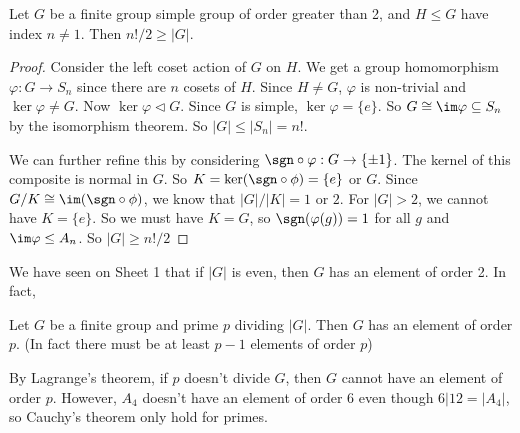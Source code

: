 \documentclass[a4paper]{article}
\begin{document}
  \begin{eg}
    Let $G$ be a finite group simple group of order greater than 2, and $H\leq G$ have index $n\not= 1$. Then $n!/2 \geq |G|$.
  \end{eg}

  \begin{proof}
    Consider the left coset action of $G$ on $H$. We get a group homomorphism $\varphi: G\to S_n$ since there are $n$ cosets of $H$. Since $H\not= G$, $\varphi$ is non-trivial and $\ker \varphi \not=G$. Now $\ker \varphi \lhd G$. Since $G$ is simple, $\ker\varphi = \{e\}$. So $G\cong \im \varphi \subseteq S_n$ by the isomorphism theorem. So $|G| \leq |S_n| = n!$.

    We can further refine this by considering $\sgn\circ \varphi: G \to \{\pm 1\}$. The kernel of this composite is normal in $G$. So $K = \ker(\sgn\circ\phi) = \{e\}$ or $G$. Since $G/K\cong \im (\sgn\circ\phi)$, we know that $|G|/|K| = 1$ or $2$. For $|G|> 2$, we cannot have $K = \{e\}$. So we must have $K = G$, so $\sgn(\varphi(g)) = 1$ for all $g$ and $\im \varphi \leq A_n$. So $|G|\geq n!/2$
  \end{proof}

  We have seen on Sheet 1 that if $|G|$ is even, then $G$ has an element of order 2. In fact,
  \begin{thm}
    Let $G$ be a finite group and prime $p$ dividing $|G|$. Then $G$ has an element of order $p$. (In fact there must be at least $p - 1$ elements of order $p$)

    \note By Lagrange's theorem, if $p$ doesn't divide $G$, then $G$ cannot have an element of order $p$. However, $A_4$ doesn't have an element of order $6$ even though $6 | 12 = |A_4|$, so Cauchy's theorem only hold for primes.
  \end{thm}
\end{document}
